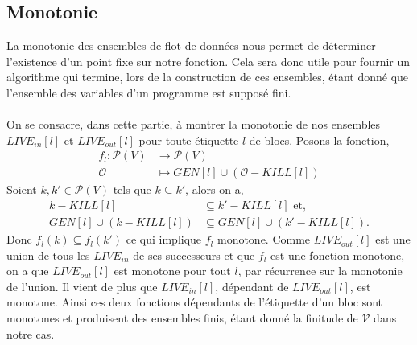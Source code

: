 \subsection{Monotonie}
La monotonie des ensembles de flot de données nous permet de déterminer l'existence d'un point fixe sur notre
fonction. Cela sera donc utile pour fournir un algorithme qui termine, lors de la construction de ces ensembles, 
étant donné que l'ensemble des variables d'un programme est supposé fini.
\\
\\
On se consacre, dans cette partie, à montrer la monotonie de nos ensembles $LIVE_{in}[l]$ et $LIVE_{out}[l]$
pour toute étiquette $l$ de blocs. Posons la fonction,
\begin{align*}
	f_l : \mathcal{P}(V) &\longrightarrow \mathcal{P}(V) \\
	\mathcal{O} &\longmapsto GEN[l] \cup (\mathcal{O} - KILL[l])
\end{align*}
Soient $k, k' \in \mathcal{P}(V)$ tels que $k \subseteq k'$, alors on a,
\begin{align*}
	k - KILL[l] &\subseteq k' - KILL[l] \text{ et,}\\
	GEN[l] \cup (k - KILL[l]) &\subseteq GEN[l] \cup (k' - KILL[l]).
\end{align*}
Donc $f_l(k) \subseteq f_l(k')$ ce qui implique $f_l$ monotone. Comme $LIVE_{out}[l]$ est une union de tous les $LIVE_{in}$
de ses successeurs et que $f_l$ est une fonction monotone, on a que $LIVE_{out}[l]$ est monotone pour tout $l$, par récurrence
sur la monotonie de l'union. Il vient de plus que $LIVE_{in}[l]$, dépendant de $LIVE_{out}[l]$, est monotone.
Ainsi ces deux fonctions dépendants de l'étiquette d'un bloc sont monotones et produisent des ensembles finis, étant donné
la finitude de $\mathcal{V}$ dans notre cas.
